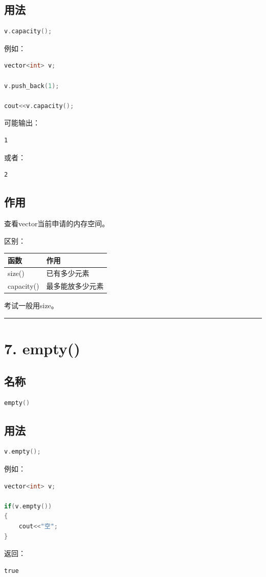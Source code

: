 \documentclass[10pt,twocolumn]{extarticle}
\begin{document}
\subsection{用法}
\begin{lstlisting}[language=C++]
v.capacity();
\end{lstlisting}
例如：
\begin{lstlisting}[language=C++]
vector<int> v;

v.push_back(1);

cout<<v.capacity();
\end{lstlisting}
可能输出：
\begin{lstlisting}
1
\end{lstlisting}
或者：
\begin{lstlisting}
2
\end{lstlisting}

\subsection{作用}
查看vector当前申请的内存空间。

区别：
\begin{table}[h]
\centering
\begin{tabular}{|l|l|}
\hline
函数 & 作用 \\ \hline
size() & 已有多少元素 \\ \hline
capacity() & 最多能放多少元素 \\ \hline
\end{tabular}
\end{table}

考试一般用size。

\noindent\rule{\linewidth}{0.4pt}

\section{7. empty()}

\subsection{名称}
\begin{lstlisting}[language=C++]
empty()
\end{lstlisting}

\subsection{用法}
\begin{lstlisting}[language=C++]
v.empty();
\end{lstlisting}
例如：
\begin{lstlisting}[language=C++]
vector<int> v;

if(v.empty())
{
    cout<<"空";
}
\end{lstlisting}
返回：
\begin{lstlisting}
true
\end{lstlisting}
\end{document}
